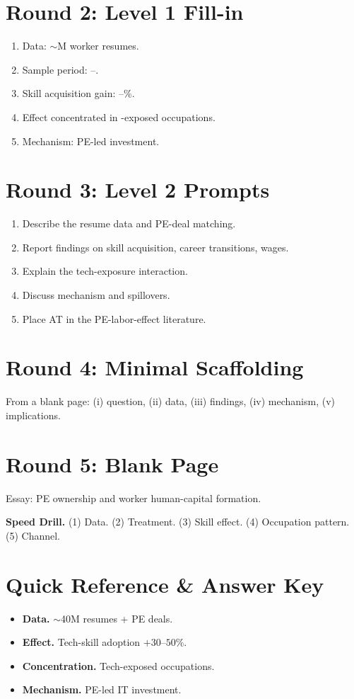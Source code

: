 \documentclass[11pt]{article}
\newcommand{\blank}[1]{\underline{\hspace{#1}}}
\begin{document}
\section*{Round 2: Level 1 Fill-in}
\begin{enumerate}
\item Data: $\sim$\blank{1cm}M worker resumes.
\item Sample period: \blank{1cm}--\blank{1cm}.
\item Skill acquisition gain: \blank{1cm}--\blank{1cm}\%.
\item Effect concentrated in \blank{2cm}-exposed occupations.
\item Mechanism: PE-led \blank{1cm} investment.
\end{enumerate}

\section*{Round 3: Level 2 Prompts}
\begin{enumerate}
\item Describe the resume data and PE-deal matching.
\item Report findings on skill acquisition, career transitions, wages.
\item Explain the tech-exposure interaction.
\item Discuss mechanism and spillovers.
\item Place AT in the PE-labor-effect literature.
\end{enumerate}

\section*{Round 4: Minimal Scaffolding}
From a blank page: (i) question, (ii) data, (iii) findings, (iv) mechanism, (v) implications.

\section*{Round 5: Blank Page}
Essay: PE ownership and worker human-capital formation.

\vspace{6pt}
\begin{drillbox}
\textbf{Speed Drill.} (1) Data. (2) Treatment. (3) Skill effect. (4) Occupation pattern. (5) Channel.
\end{drillbox}

\section*{Quick Reference \& Answer Key}
\begin{answerbox}
\begin{itemize}
\item \textbf{Data.} $\sim$40M resumes + PE deals.
\item \textbf{Effect.} Tech-skill adoption $+30$--$50$\%.
\item \textbf{Concentration.} Tech-exposed occupations.
\item \textbf{Mechanism.} PE-led IT investment.
\end{itemize}
\end{answerbox}
\end{document}
